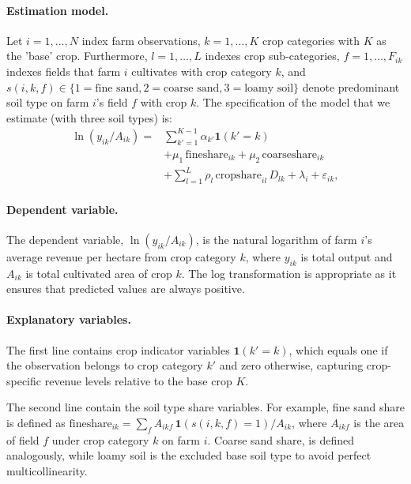 \documentclass[12pt]{article}
\begin{document}
\paragraph{Estimation model.}
Let $i = 1, \ldots, N$ index farm observations, $k = 1, \ldots, K$ crop categories with $K$ as the 'base' crop.
Furthermore, $l = 1, \ldots, L$ indexes crop sub-categories, $f = 1, \ldots, F_{ik}$ indexes fields that farm $i$ cultivates with crop category $k$, and $s(i,k,f) \in \{1 = \text{fine sand}, 2 = \text{coarse sand}, 3 = \text{loamy soil}\}$ denote predominant soil type on farm $i$'s field $f$ with crop $k$. 
The specification of the model that we estimate (with three soil types) is:
\begin{equation}
\begin{aligned}
    \ln(y_{ik}/A_{ik}) = & \sum_{k'=1}^{K-1} \alpha_{k'} \mathbf{1}(k'=k) \\
    &+ \mu_1\,\text{fineshare}_{ik} + \mu_2\,\text{coarseshare}_{ik} \\
    &+ \sum_{l=1}^{L} \rho_l\,\text{cropshare}_{il}\,D_{lk} 
    + \lambda_i + \varepsilon_{ik},
    \end{aligned}
    \label{eq:est-model-spec-estimated}
\end{equation}
\paragraph{Dependent variable.} The dependent variable, $\ln(y_{ik}/A_{ik})$, is the natural logarithm of farm $i$'s average revenue per hectare from crop category $k$, where $y_{ik}$ is total output and $A_{ik}$ is total cultivated area of crop $k$.
The log transformation is appropriate as it ensures that predicted values are always positive.

\paragraph{Explanatory variables.}
The first line contains crop indicator variables $\mathbf{1}(k'=k)$, which equals one if the observation belongs to crop category $k'$ and zero otherwise, capturing crop-specific revenue levels relative to the base crop $K$.

The second line contain the soil type share variables. 
For example, fine sand share is defined as $\text{fineshare}_{ik} = \sum_f A_{ikf}\,\mathbf{1}(s(i,k,f)=1) / A_{ik}$, where $A_{ikf}$ is the area of field $f$ under crop category $k$ on farm $i$. 
Coarse sand share, is defined analogously, while loamy soil is the excluded base soil type to avoid perfect multicollinearity.
\end{document}
